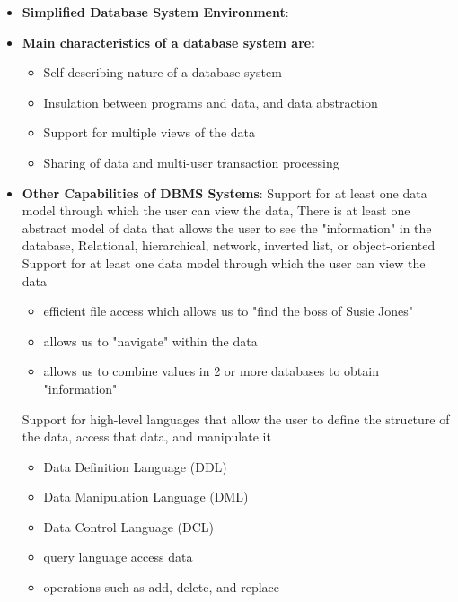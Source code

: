 \documentclass{report}
\begin{document}
\begin{itemize}
\begin{itemize}
            \end{itemize}
        \item \textbf{Simplified Database System Environment}:
            \bigbreak \noindent 
        \item \textbf{Main characteristics of a database system are:}
            \begin{itemize}
                \item Self-describing nature of a database system
                \item Insulation between programs and data, and data abstraction
                \item Support for multiple views of the data
                \item Sharing of data and multi-user transaction processing
            \end{itemize}
        \item \textbf{Other Capabilities of DBMS Systems}: Support for at least one data model through which the user can view the data, There is at least one abstract model of data that allows the user to see the "information" in the database, Relational, hierarchical, network, inverted list, or object-oriented
            \bigbreak \noindent 
            Support for at least one data model through which the user can view the data
            \begin{itemize}
                \item efficient file access which allows us to "find the boss of Susie Jones"
                \item allows us to "navigate" within the data
                \item allows us to combine values in 2 or more databases to obtain "information"
            \end{itemize}
            \bigbreak \noindent 
            Support for high-level languages that allow the user to define the structure of the data, access that data, and manipulate it
            \begin{itemize}
                \item Data Definition Language (DDL)
                \item Data Manipulation Language (DML)
                \item Data Control Language (DCL)
                \item query language access data
                \item operations such as add, delete, and replace

\end{itemize}
\end{itemize}
\end{document}
